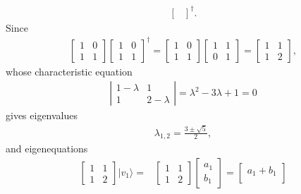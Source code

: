 \documentclass[en]{sol-man}
\begin{document}
\begin{sol}
\begin{align}
{\begin{bmatrix}
        \end{bmatrix}^{\dagger}}.
    \end{align}
    Since
    \begin{align}
        \begin{bmatrix}
            1&0\\
            1&1
        \end{bmatrix}\begin{bmatrix}
            1&0\\
            1&1
        \end{bmatrix}^{\dagger}=\begin{bmatrix}
            1&0\\
            1&1
        \end{bmatrix}\begin{bmatrix}
            1&1\\
            0&1
        \end{bmatrix}=\begin{bmatrix}
            1&1\\
            1&2
        \end{bmatrix},
    \end{align}
    whose characteristic equation
    \begin{align}
        \left\lvert\begin{matrix}
            1-\lambda&1\\
            1&2-\lambda
        \end{matrix}\right\rvert=\lambda^2-3\lambda+1=0
    \end{align}
    gives eigenvalues
    \begin{align}
        \lambda_{1,2}=\frac{3\pm\sqrt{5}}{2},
    \end{align}
    and eigenequations
    \begin{align}
        \begin{bmatrix}
            1&1\\
            1&2
        \end{bmatrix}\lvert v_1\rangle=&\begin{bmatrix}
            1&1\\
            1&2
        \end{bmatrix}\begin{bmatrix}
            a_1\\
            b_1
        \end{bmatrix}=\begin{bmatrix}
            a_1+b_1\\

\end{bmatrix}
\end{align}
\end{sol}
\end{document}
